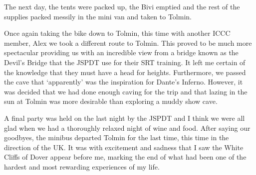 The next day, the tents were packed up, the Bivi emptied and the rest of
the supplies packed messily in the mini van and taken to Tolmin.

Once again taking the bike down to Tolmin, this time with another ICCC
member, Alex we took a different route to Tolmin. This proved to be much
more spectacular providing us with an incredible view from a bridge
known as the Devil's Bridge that the JSPDT use for their SRT training.
It left me certain of the knowledge that they must have a head for
heights. Furthermore, we passed the cave that `apparently' was the
inspiration for Dante's Inferno. However, it was decided that we had
done enough caving for the trip and that lazing in the sun at Tolmin was
more desirable than exploring a muddy show cave.

A final party was held on the last night by the JSPDT and I think we
were all glad when we had a thoroughly relaxed night of wine and food.
After saying our goodbyes, the minibus departed Tolmin for the last
time, this time in the direction of the UK. It was with excitement and
sadness that I saw the White Cliffs of Dover appear before me, marking
the end of what had been one of the hardest and most rewarding
experiences of my life.
